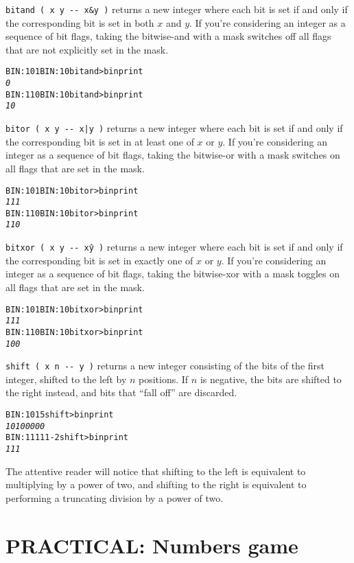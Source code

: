 \documentclass[english]{article}
\begin{document}
\texttt{bitand ( x y -{}- x\&y )} returns a new integer where each bit is set if and only if the corresponding bit is set in both $x$ and $y$. If you're considering an integer as a sequence of bit flags, taking the bitwise-and with a mask switches off all flags that are not explicitly set in the mask.

\begin{alltt}
BIN: 101 BIN: 10 bitand >bin print
\emph{0}
BIN: 110 BIN: 10 bitand >bin print
\emph{10}
\end{alltt}

\texttt{bitor ( x y -{}- x|y )} returns a new integer where each bit is set if and only if the corresponding bit is set in at least one of $x$ or $y$. If you're considering an integer as a sequence of bit flags, taking the bitwise-or with a mask switches on all flags that are set in the mask.

\begin{alltt}
BIN: 101 BIN: 10 bitor >bin print
\emph{111}
BIN: 110 BIN: 10 bitor >bin print
\emph{110}
\end{alltt}

\texttt{bitxor ( x y -{}- x\^y )} returns a new integer where each bit is set if and only if the corresponding bit is set in exactly one of $x$ or $y$. If you're considering an integer as a sequence of bit flags, taking the bitwise-xor with a mask toggles on all flags that are set in the mask.

\begin{alltt}
BIN: 101 BIN: 10 bitxor >bin print
\emph{111}
BIN: 110 BIN: 10 bitxor >bin print
\emph{100}
\end{alltt}

\texttt{shift ( x n -{}- y )} returns a new integer consisting of the bits of the first integer, shifted to the left by $n$ positions. If $n$ is negative, the bits are shifted to the right instead, and bits that ``fall off'' are discarded.

\begin{alltt}
BIN: 101 5 shift >bin print
\emph{10100000}
BIN: 11111 -2 shift >bin print
\emph{111}
\end{alltt}

The attentive reader will notice that shifting to the left is equivalent to multiplying by a power of two, and shifting to the right is equivalent to performing a truncating division by a power of two.

\section{PRACTICAL: Numbers game}
\end{document}
